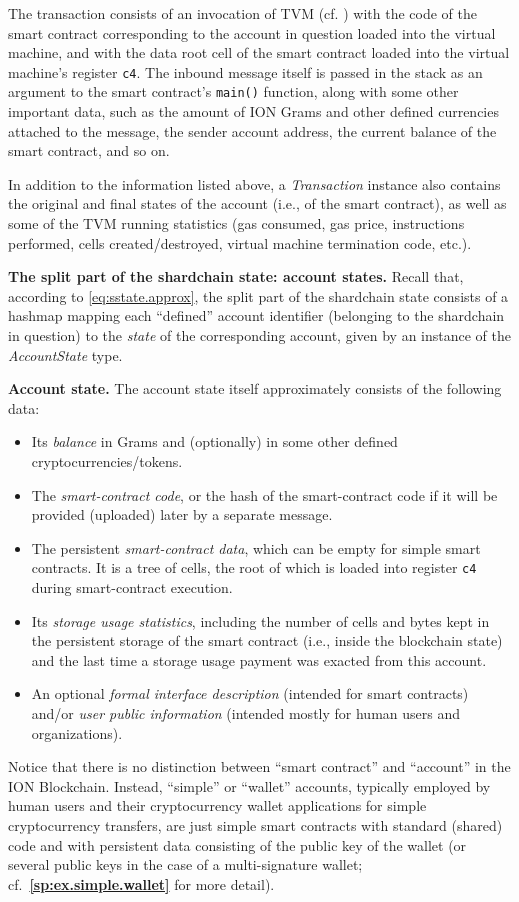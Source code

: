 \documentclass[12pt,oneside]{article}
\def\makepoint#1{\medbreak\noindent{\bf #1.\ }}
\def\nxsubpoint{\refstepcounter{subsubsection}%
  \smallbreak\makepoint{\thesubsubsection}}
\def\refpoint#1{{\rm\textbf{\ref{#1}}}}
\let\ptref=\refpoint
\def\emb#1{\textbf{#1.}}
\begin{document}
The transaction consists of an invocation of TVM (cf. \cite{TVM}) with the code of the smart contract corresponding to the account in question loaded into the virtual machine, and with the data root cell of the smart contract loaded into the virtual machine's register \texttt{c4}. The inbound message itself is passed in the stack as an argument to the smart contract's {\tt main()} function, along with some other important data, such as the amount of ION Grams and other defined currencies attached to the message, the sender account address, the current balance of the smart contract, and so on.

In addition to the information listed above, a {\em Transaction\/} instance also contains the original and final states of the account (i.e., of the smart contract), as well as some of the TVM running statistics (gas consumed, gas price, instructions performed, cells created/destroyed, virtual machine termination code, etc.).

\nxsubpoint\emb{The split part of the shardchain state: account states}
Recall that, according to \eqref{eq:sstate.approx}, the split part of the shardchain state consists of a hashmap mapping each ``defined'' account identifier (belonging to the shardchain in question) to the {\em state\/} of the corresponding account, given by an instance of the {\em AccountState\/} type.

\nxsubpoint\emb{Account state}
The account state itself approximately consists of the following data:
\begin{itemize}
\item Its {\em balance} in Grams and (optionally) in some other defined cryptocurrencies/tokens.
\item The {\em smart-contract code}, or the hash of the smart-contract code if it will be provided (uploaded) later by a separate message.
\item The persistent {\em smart-contract data}, which can be empty for simple smart contracts. It is a tree of cells, the root of which is loaded into register {\tt c4} during smart-contract execution.
\item Its {\em storage usage statistics}, including the number of cells and bytes kept in the persistent storage of the smart contract (i.e., inside the blockchain state) and the last time a storage usage payment was exacted from this account.
\item An optional {\em formal interface description} (intended for smart contracts) and/or {\em user public information} (intended mostly for human users and organizations).
\end{itemize}
Notice that there is no distinction between ``smart contract'' and ``account'' in the ION Blockchain. Instead, ``simple'' or ``wallet'' accounts, typically employed by human users and their cryptocurrency wallet applications for simple cryptocurrency transfers, are just simple smart contracts with standard (shared) code and with persistent data consisting of the public key of the wallet (or several public keys in the case of a multi-signature wallet; cf.~\ptref{sp:ex.simple.wallet} for more detail).
\end{document}
